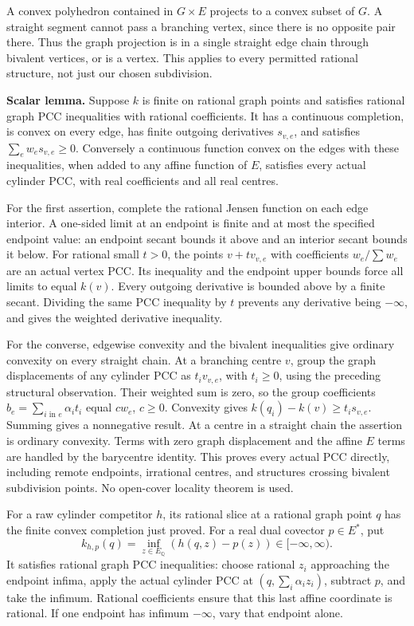 \documentclass[
  11pt,
]{article}
\begin{document}
A convex polyhedron contained in \(G\times E\) projects to a convex
subset of \(G\). A straight segment cannot pass a branching vertex,
since there is no opposite pair there. Thus the graph projection is in a
single straight edge chain through bivalent vertices, or is a vertex.
This applies to every permitted rational structure, not just our chosen
subdivision.

\textbf{Scalar lemma.} Suppose \(k\) is finite on rational graph points
and satisfies rational graph PCC inequalities with rational
coefficients. It has a continuous completion, is convex on every edge,
has finite outgoing derivatives \(s_{v,e}\), and satisfies
\(\sum_e w_es_{v,e}\geq0\). Conversely a continuous function convex on
the edges with these inequalities, when added to any affine function of
\(E\), satisfies every actual cylinder PCC, with real coefficients and
all real centres.

For the first assertion, complete the rational Jensen function on each
edge interior. A one-sided limit at an endpoint is finite and at most
the specified endpoint value: an endpoint secant bounds it above and an
interior secant bounds it below. For rational small \(t>0\), the points
\(v+t v_{v,e}\) with coefficients \(w_e/\sum w_e\) are an actual vertex
PCC. Its inequality and the endpoint upper bounds force all limits to
equal \(k(v)\). Every outgoing derivative is bounded above by a finite
secant. Dividing the same PCC inequality by \(t\) prevents any
derivative being \(-\infty\), and gives the weighted derivative
inequality.

For the converse, edgewise convexity and the bivalent inequalities give
ordinary convexity on every straight chain. At a branching centre \(v\),
group the graph displacements of any cylinder PCC as \(t_i v_{v,e}\),
with \(t_i\geq0\), using the preceding structural observation. Their
weighted sum is zero, so the group coefficients
\(b_e=\sum_{i\text{ in }e}\alpha_it_i\) equal \(cw_e\), \(c\geq0\).
Convexity gives \(k(q_i)-k(v)\geq t_i s_{v,e}\). Summing gives a
nonnegative result. At a centre in a straight chain the assertion is
ordinary convexity. Terms with zero graph displacement and the affine
\(E\) terms are handled by the barycentre identity. This proves every
actual PCC directly, including remote endpoints, irrational centres, and
structures crossing bivalent subdivision points. No open-cover locality
theorem is used.

For a raw cylinder competitor \(h\), its rational slice at a rational
graph point \(q\) has the finite convex completion just proved. For a
real dual covector \(p\in E^*\), put \[
 k_{h,p}(q)=\inf_{z\in E_\mathbb Q}(h(q,z)-p(z))\in[-\infty,\infty).             \tag{7}
\] It satisfies rational graph PCC inequalities: choose rational \(z_i\)
approaching the endpoint infima, apply the actual cylinder PCC at
\((q,\sum_i\alpha_i z_i)\), subtract \(p\), and take the infimum.
Rational coefficients ensure that this last affine coordinate is
rational. If one endpoint has infimum \(-\infty\), vary that endpoint
alone.
\end{document}
